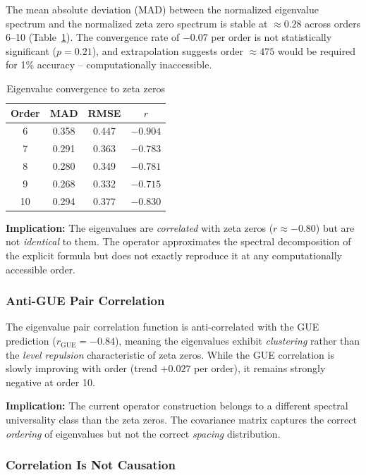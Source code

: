 \documentclass[11pt,a4paper]{article}
\begin{document}
The mean absolute deviation (MAD) between the normalized eigenvalue
spectrum and the normalized zeta zero spectrum is stable at
$\approx 0.28$ across orders 6--10 (Table~\ref{tab:convergence}).
The convergence rate of $-0.07$ per order is not statistically
significant ($p = 0.21$), and extrapolation suggests order $\approx
475$ would be required for 1\% accuracy -- computationally inaccessible.

\begin{table}[h]
\centering
\caption{Eigenvalue convergence to zeta zeros}
\label{tab:convergence}
\begin{tabular}{cccc}
\toprule
Order & MAD & RMSE & $r$ \\
\midrule
6  & 0.358 & 0.447 & $-0.904$ \\
7  & 0.291 & 0.363 & $-0.783$ \\
8  & 0.280 & 0.349 & $-0.781$ \\
9  & 0.268 & 0.332 & $-0.715$ \\
10 & 0.294 & 0.377 & $-0.830$ \\
\bottomrule
\end{tabular}
\end{table}

\textbf{Implication:} The eigenvalues are \emph{correlated} with zeta
zeros ($r \approx -0.80$) but are not \emph{identical} to them.  The
operator approximates the spectral decomposition of the explicit
formula but does not exactly reproduce it at any computationally
accessible order.

\subsubsection{Anti-GUE Pair Correlation}

The eigenvalue pair correlation function is anti-correlated with the
GUE prediction ($r_{\text{GUE}} = -0.84$), meaning the eigenvalues
exhibit \emph{clustering} rather than the \emph{level repulsion}
characteristic of zeta zeros.  While the GUE correlation is slowly
improving with order (trend $+0.027$ per order), it remains strongly
negative at order 10.

\textbf{Implication:} The current operator construction belongs to a
different spectral universality class than the zeta zeros.  The
covariance matrix captures the correct \emph{ordering} of eigenvalues
but not the correct \emph{spacing} distribution.

\subsubsection{Correlation Is Not Causation}
\end{document}
